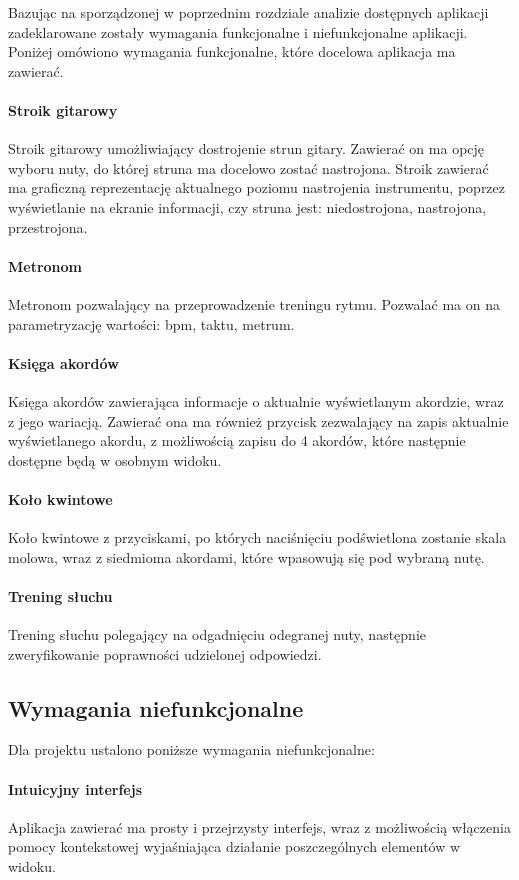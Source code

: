 Bazując na sporządzonej w poprzednim rozdziale analizie dostępnych aplikacji zadeklarowane zostały wymagania funkcjonalne i niefunkcjonalne aplikacji. Poniżej omówiono wymagania funkcjonalne, które docelowa aplikacja ma zawierać.

\paragraph{Stroik gitarowy} Stroik gitarowy umożliwiający dostrojenie strun gitary. Zawierać on ma opcję wyboru nuty, do której struna ma docelowo zostać nastrojona. Stroik zawierać ma graficzną reprezentację aktualnego poziomu nastrojenia instrumentu, poprzez wyświetlanie na ekranie informacji, czy struna jest: niedostrojona, nastrojona, przestrojona.
\paragraph{Metronom} Metronom pozwalający na przeprowadzenie treningu rytmu. Pozwalać ma on na parametryzację wartości: bpm, taktu, metrum.
\paragraph{Księga akordów} Księga akordów zawierająca informacje o aktualnie wyświetlanym akordzie, wraz z jego wariacją. Zawierać ona ma również przycisk zezwalający na zapis aktualnie wyświetlanego akordu, z możliwością zapisu do 4 akordów, które następnie dostępne będą w osobnym widoku.
\paragraph{Koło kwintowe} Koło kwintowe z przyciskami, po których naciśnięciu podświetlona zostanie skala molowa, wraz z siedmioma akordami, które wpasowują się pod wybraną nutę.
\paragraph{Trening słuchu} Trening słuchu polegający na odgadnięciu odegranej nuty, następnie zweryfikowanie poprawności udzielonej odpowiedzi. 

\subsection{Wymagania niefunkcjonalne}

Dla projektu ustalono poniższe wymagania niefunkcjonalne:

\paragraph{Intuicyjny interfejs} Aplikacja zawierać ma prosty i przejrzysty interfejs, wraz z możliwością włączenia pomocy kontekstowej wyjaśniająca działanie poszczególnych elementów w widoku.
